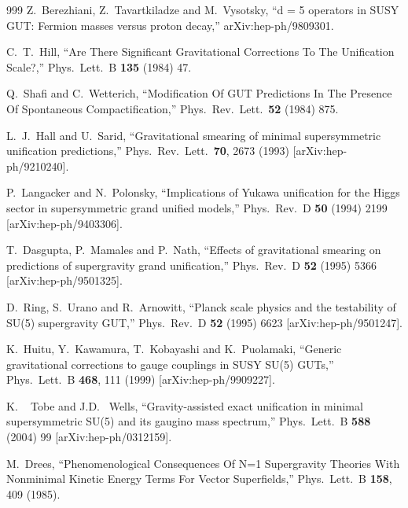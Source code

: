 \begin{thebibliography}{999}
  Z.~Berezhiani, Z.~Tavartkiladze and M.~Vysotsky,
  ``d = 5 operators in SUSY GUT: Fermion masses versus proton decay,''
  arXiv:hep-ph/9809301.

  C.~T.~Hill,
  ``Are There Significant Gravitational Corrections To The Unification
  Scale?,''
  Phys.\ Lett.\ B {\bf 135} (1984) 47.

  Q.~Shafi and C.~Wetterich,
  ``Modification Of GUT Predictions In The Presence Of Spontaneous
  Compactification,''
  Phys.\ Rev.\ Lett.\  {\bf 52} (1984) 875.

  L.~J.~Hall and U.~Sarid,
  ``Gravitational smearing of minimal supersymmetric unification predictions,''
  Phys.\ Rev.\ Lett.\  {\bf 70}, 2673 (1993)
  [arXiv:hep-ph/9210240].

  P.~Langacker and N.~Polonsky,
  ``Implications of Yukawa unification for the Higgs sector in supersymmetric
  grand unified models,''
  Phys.\ Rev.\ D {\bf 50} (1994) 2199
  [arXiv:hep-ph/9403306].

  T.~Dasgupta, P.~Mamales and P.~Nath,
  ``Effects of gravitational smearing on predictions of supergravity grand
  unification,''
  Phys.\ Rev.\ D {\bf 52} (1995) 5366
  [arXiv:hep-ph/9501325].

  D.~Ring, S.~Urano and R.~Arnowitt,
  ``Planck scale physics and the testability of SU(5) supergravity GUT,''
  Phys.\ Rev.\ D {\bf 52} (1995) 6623
  [arXiv:hep-ph/9501247].

  K.~Huitu, Y.~Kawamura, T.~Kobayashi and K.~Puolamaki,
  ``Generic gravitational corrections to gauge couplings in SUSY SU(5)  GUTs,''
  Phys.\ Lett.\ B {\bf 468}, 111 (1999)
  [arXiv:hep-ph/9909227].

  K. ~ Tobe and J.D. ~Wells, 
``Gravity-assisted exact unification in minimal supersymmetric SU(5) and  its
  gaugino mass spectrum,''
  Phys.\ Lett.\ B {\bf 588} (2004) 99
  [arXiv:hep-ph/0312159].

  M.~Drees,
  ``Phenomenological Consequences Of N=1 Supergravity Theories With Nonminimal
  Kinetic Energy Terms For Vector Superfields,''
  Phys.\ Lett.\ B {\bf 158}, 409 (1985).


\end{thebibliography}
